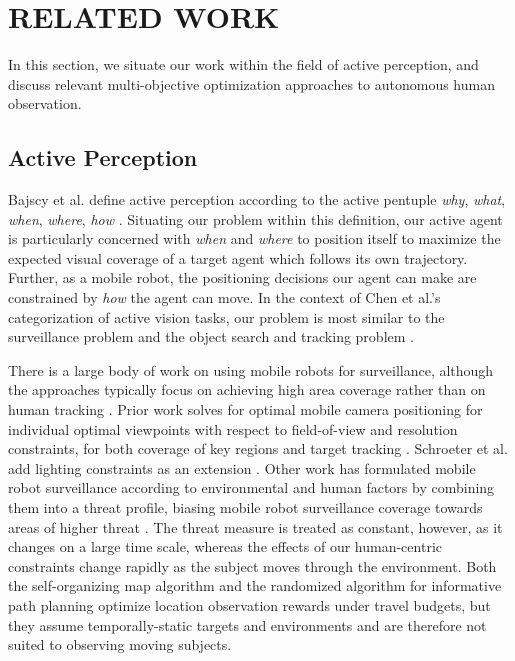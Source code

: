\documentclass[letterpaper, 10 pt, conference]{ieeeconf}  %
\begin{document}
\section{RELATED WORK}

In this section, we situate our work within the field of active perception, and discuss relevant multi-objective optimization approaches to autonomous human observation. 

\subsection{Active Perception}
Bajscy et al. define active perception according to the active pentuple \textit{why}, \textit{what}, \textit{when}, \textit{where}, \textit{how} \cite{bajcsy2018revisiting}.  Situating our problem within this definition, our active agent is particularly concerned with \textit{when} and \textit{where} to position itself to maximize the expected visual coverage of a target agent which follows its own trajectory.  Further, as a mobile robot, the positioning decisions our agent can make are constrained by \textit{how} the agent can move.  In the context of Chen et al.'s categorization of active vision tasks, our problem is most similar to the surveillance problem and the object search and tracking problem \cite{chen2011active}.

There is a large body of work on using mobile robots for surveillance, although the approaches typically focus on achieving high area coverage rather than on human tracking \cite{chen2011active}.  Prior work solves for optimal mobile camera positioning for individual optimal viewpoints with respect to field-of-view and resolution constraints, for both coverage of key regions \cite{nilsson2009towards} and target tracking \cite{bodor2005mobile}.  Schroeter et al. add lighting constraints as an extension \cite{schroeter2009autonomous}.  Other work has formulated mobile robot surveillance according to environmental and human factors by combining them into a threat profile, biasing mobile robot surveillance coverage towards areas of higher threat \cite{ma2009matching}.  The threat measure is treated as constant, however, as it changes on a large time scale, whereas the effects of our human-centric constraints change rapidly as the subject moves through the environment.  Both the self-organizing map algorithm \cite{best2016multi} and the randomized algorithm for informative path planning \cite{arora2017randomized} optimize location observation rewards under travel budgets, but they assume temporally-static targets and environments and are therefore not suited to observing moving subjects.
\end{document}
